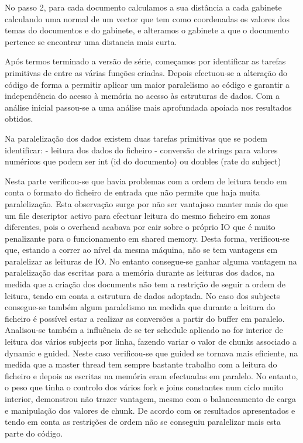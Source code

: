 \documentclass[times, 10pt,twocolumn]{article}
\begin{document}
No passo 2, para cada documento calculamos a sua distância a cada gabinete calculando uma normal de um vector que tem como coordenadas os valores dos temas do documentos e do gabinete, e alteramos o gabinete a que o documento pertence se encontrar uma distancia mais curta.

Após termos terminado a versão de série, começamos por identificar as tarefas primitivas de entre as várias funções criadas.
Depois efectuou-se a alteração do código de forma a permitir aplicar um maior paralelismo ao código e garantir a independência do acesso à memória no acesso às estruturas de dados.
Com a análise inicial passou-se a uma análise mais aprofundada apoiada nos resultados obtidos.



Na paralelização dos dados existem duas tarefas primitivas que se podem identificar:
- leitura dos dados do ficheiro
- conversão de strings para valores numéricos que podem ser int (id do documento) ou doubles (rate do subject)

Nesta parte verificou-se que havia problemas com a ordem de leitura tendo em conta o formato do ficheiro de entrada que não permite que haja muita paralelização. Esta observação surge por não ser vantajoso manter mais do que um file descriptor activo para efectuar leitura do mesmo ficheiro em zonas diferentes, pois o overhead acabava por cair sobre o próprio IO que é muito penalizante para o funcionamento em shared memory.
Desta forma, verificou-se que, estando a correr ao nível da mesma máquina, não se tem vantagens em paralelizar as leituras de IO. No entanto consegue-se ganhar alguma vantagem na paralelização das escritas para a memória durante as leituras dos dados, na medida que a criação dos documents não tem a restrição de seguir a ordem de leitura, tendo em conta a estrutura de dados adoptada. No caso dos subjects consegue-se também algum paralelismo na medida que durante a leitura do ficheiro é possível estar a realizar as conversões a partir do buffer em paralelo.
Analisou-se também a influência de se ter schedule aplicado no for interior de leitura dos vários subjects por linha, fazendo variar o valor de chunks associado a dynamic e guided. Neste caso verificou-se que guided se tornava mais eficiente, na medida que a master thread tem sempre bastante trabalho com a leitura do ficheiro e depois as escritas na memória eram efectuadas em paralelo. No entanto, o peso que tinha o controlo dos vários fork e joins constantes num ciclo muito interior, demonstrou não trazer vantagem, mesmo com o balanceamento de carga e manipulação dos valores de chunk.
De acordo com os resultados apresentados e tendo em conta as restrições de ordem não se conseguiu paralelizar mais esta parte do código.
\end{document}
